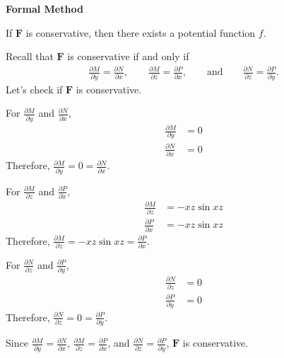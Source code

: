 \documentclass{article}
\newcommand{\F}[0]{\mathbf{F}}
\begin{document}
{}\textbf{Formal Method}

If $\F$ is conservative, then there exists a potential function $f$.

Recall that $\F$ is conservative if and only if
\begin{align*}
    \frac{\partial M}{\partial y}=\frac{\partial N}{\partial x},\hspace{2em}\frac{\partial M}{\partial z}=\frac{\partial P}{\partial x},\hspace{2em} \text{and}\hspace{2em}\frac{\partial N}{\partial z}=\frac{\partial P}{\partial y}.
\end{align*}
Let's check if $\F$ is conservative.

{}
For $\displaystyle \frac{\partial M}{\partial y}$ and $\displaystyle \frac{\partial N}{\partial x}$,
\begin{align*}
    \frac{\partial M}{\partial y}&=0\\
    \frac{\partial N}{\partial x}&=0
\end{align*}
Therefore, $\displaystyle \frac{\partial M}{\partial y}=0= \frac{\partial N}{\partial x}$.

{}
For $\displaystyle \frac{\partial M}{\partial z}$ and $\displaystyle\frac{\partial P}{\partial x}$,
\begin{align*}
    \frac{\partial M}{\partial z}&=-xz\sin xz\\
    \frac{\partial P}{\partial x}&=-xz\sin xz
\end{align*}
Therefore, $\displaystyle \frac{\partial M}{\partial z}=-xz\sin xz=\frac{\partial P}{\partial x}$.

{}
For $\displaystyle \frac{\partial N}{\partial z}$ and $\displaystyle\frac{\partial P}{\partial y}$,
\begin{align*}
    \frac{\partial N}{\partial z}&=0\\
    \frac{\partial P}{\partial y}&=0
\end{align*}
Therefore, $\displaystyle \frac{\partial N}{\partial z}=0=\frac{\partial P}{\partial y}$.

Since $\displaystyle \frac{\partial M}{\partial y}=\frac{\partial N}{\partial x}$, $\displaystyle \frac{\partial M}{\partial z}=\frac{\partial P}{\partial x}$, and $\displaystyle \frac{\partial N}{\partial z}=\frac{\partial P}{\partial y}$, $\F$ is conservative.
\end{document}
